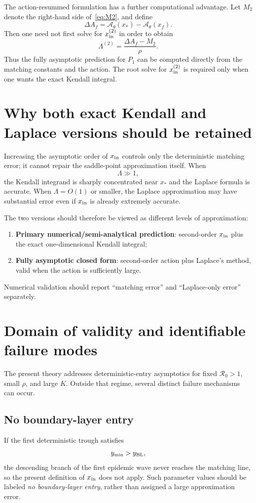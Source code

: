 \documentclass[11pt,a4paper]{article}
\newcommand{\Rzero}{\mathcal R_0}
\newcommand{\Afun}{\mathcal A_\theta}
\newcommand{\BL}{y_{\rm BL}}
\newcommand{\xf}{x_f}
\newcommand{\xs}{x_*}
\begin{document}
The action-resummed formulation has a further computational advantage. Let $M_2$ denote the right-hand side of~\eqref{eq:M2}, and define
\[
\Delta A_f=\Afun(\xs)-\Afun(\xf).
\]
Then one need not first solve for $x_{\rm in}^{(2)}$ in order to obtain
\begin{equation}
\label{eq:LambdaM2}
\Lambda^{(2)}
=\frac{\Delta A_f-M_2}{\rho}.
\end{equation}
Thus the fully asymptotic prediction for $P_1$ can be computed directly from the matching constants and the action. The root solve for $x_{\rm in}^{(2)}$ is required only when one wants the exact Kendall integral.

\section{Why both exact Kendall and Laplace versions should be retained}
Increasing the asymptotic order of $x_{\rm in}$ controls only the deterministic matching error; it cannot repair the saddle-point approximation itself. When
\[
\Lambda\gg1,
\]
the Kendall integrand is sharply concentrated near $x_*$ and the Laplace formula is accurate. When $\Lambda=O(1)$ or smaller, the Laplace approximation may have substantial error even if $x_{\rm in}$ is already extremely accurate.

The two versions should therefore be viewed as different levels of approximation:
\begin{enumerate}
\item \textbf{Primary numerical/semi-analytical prediction}: second-order $x_{\rm in}$ plus the exact one-dimensional Kendall integral;
\item \textbf{Fully asymptotic closed form}: second-order action plus Laplace's method, valid when the action is sufficiently large.
\end{enumerate}
Numerical validation should report ``matching error'' and ``Laplace-only error'' separately.

\section{Domain of validity and identifiable failure modes}
The present theory addresses deterministic-entry asymptotics for fixed $\Rzero>1$, small $\rho$, and large $K$. Outside that regime, several distinct failure mechanisms can occur.

\subsection{No boundary-layer entry}
If the first deterministic trough satisfies
\[
y_{\min}>\BL,
\]
the descending branch of the first epidemic wave never reaches the matching line, so the present definition of $x_{\rm in}$ does not apply. Such parameter values should be labeled \emph{no boundary-layer entry}, rather than assigned a large approximation error.
\end{document}

